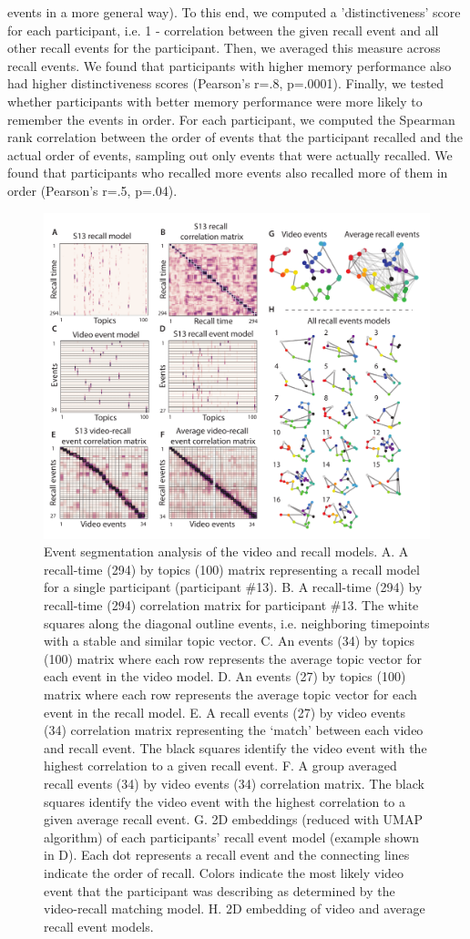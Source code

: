 \documentclass[a4paper,man,natbib,floatsintext]{apa6}
\begin{document}
events in a more general way). To this end, we computed a 'distinctiveness' score for each participant, i.e. 1 - correlation between the given recall event and all other recall events for the participant.  Then, we averaged this measure across recall events.  We found that participants with higher memory performance also had higher distinctiveness scores (Pearson's r=.8, p=.0001). Finally, we tested whether participants with better memory performance were more likely to remember the events in order.  For each participant, we computed the Spearman rank correlation between the order of events that the participant recalled and the actual order of events, sampling out only events that were actually recalled.  We found that participants who recalled more events also recalled more of them in order (Pearson's r=.5, p=.04).

\begin{figure}[t!]
\centering
\includegraphics[width=.75\textwidth]{figs/2_eventseg.pdf}
\caption{\label{fig:eventseg} Event segmentation analysis of the video and recall models. A. A recall-time (294) by topics (100) matrix representing a recall model for a single participant (participant \#13).  B. A recall-time (294) by recall-time (294) correlation matrix for participant \#13. The white squares along the diagonal outline events, i.e. neighboring timepoints with a stable and similar topic vector. C. An events (34) by topics (100) matrix where each row represents the average topic vector for each event in the video model.  D. An events (27) by topics (100) matrix where each row represents the average topic vector for each event in the recall model. E. A recall events (27) by video events (34) correlation matrix representing the `match' between each video and recall event. The black squares identify the video event with the highest correlation to a given recall event. F. A group averaged recall events (34) by video events (34) correlation matrix.  The black squares identify the video event with the highest correlation to a given average recall event. G. 2D embeddings (reduced with UMAP algorithm) of each participants' recall event model (example shown in D). Each dot represents a recall event and the connecting lines indicate the order of recall. Colors indicate the most likely video event that the participant was describing as determined by the video-recall matching model.  H. 2D embedding of video and average recall event models.  }
\end{figure}
\end{document}
